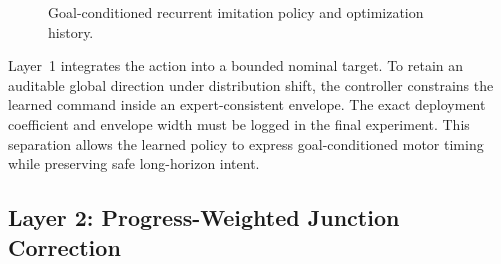 \documentclass[letterpaper,10pt,conference]{ieeeconf}
\begin{document}
\begin{figure}[t]
\centering
{}
\caption{Goal-conditioned recurrent imitation policy and optimization history.}
\label{fig:gru}
\end{figure}

\begin{table}[t]
\caption{Verified GRU Training Evidence}
\label{tab:gru}
\centering\small
{}
\end{table}

Layer~1 integrates the action into a bounded nominal target. To retain an
auditable global direction under distribution shift, the controller constrains
the learned command inside an expert-consistent envelope. The exact deployment
coefficient and envelope width must be logged in the final experiment. This
separation allows the learned policy to express goal-conditioned motor timing
while preserving safe long-horizon intent.

\subsection{Layer 2: Progress-Weighted Junction Correction}
\end{document}
